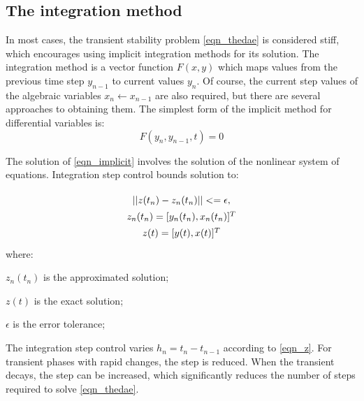 \documentclass[lettersize,journal]{IEEEtran}
\begin{document}
\subsection{The integration method}

In most cases, the transient stability problem \eqref{eqn_thedae} is considered stiff, which encourages using implicit integration methods for its solution. The integration method is a vector function \(F(x,y)\) which maps values from the previous time step \(y_{n-1}\) to current values \(y_n\). Of course, the current step values of the algebraic variables \(x_{n} \leftarrow x_{n-1}\) are also required, but there are several approaches to obtaining them. The simplest form of the implicit method for differential variables is:
\begin{equation}
	\label{eqn_implicit}
	F(y_n,y_{n-1},t)=0
\end{equation}

The solution of \eqref{eqn_implicit} involves the solution of the nonlinear system of equations. Integration step control bounds solution to:

\begin{equation}
	\label{eqn_z}
	\def\arraystretch{1.4}
	\begin{array}{c}
		\vert\vert z(t_n)-z_n(t_n) \vert\vert <= \epsilon, \\
		z_n(t_n)=[y_n(t_n), x_n(t_n)]^T	 \\
		z(t)=[y(t), x(t)]^T \\
	\end{array}
\end{equation}
\noindent where:
\begin{description}
	\item  \(z_n(t_n)\) is the approximated solution;
	\item  \(z(t)\) is the exact solution;
	\item  \(\epsilon\) is the error tolerance;
\end{description}

The integration step control varies \(h_{n}=t_{n}-t_{n-1}\) according to \eqref{eqn_z}. For transient phases with rapid changes, the step is reduced. When the transient decays, the step can be increased, which significantly reduces the number of steps required to solve \eqref{eqn_thedae}.
\end{document}
